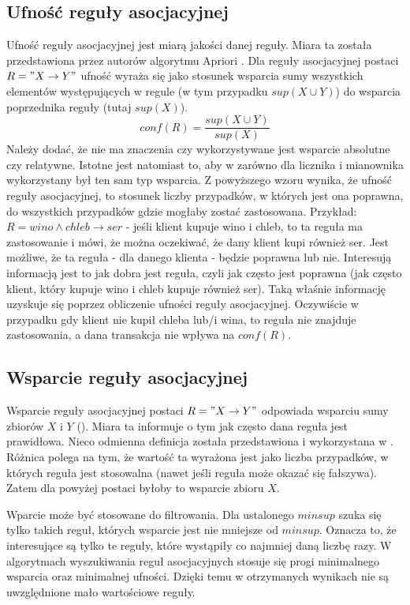 \subsection{Ufność reguły asocjacyjnej}
\label{c224}
Ufność reguły asocjacyjnej jest miarą jakości danej reguły. Miara ta została przedstawiona przez autorów algorytmu Apriori \cite{Agrawal}. Dla reguły asocjacyjnej postaci \(R = "X\rightarrow Y"\) ufność wyraża się jako stosunek wsparcia sumy wszystkich elementów występujących w regule (w tym przypadku \(sup(X \cup Y)\)) do wsparcia poprzednika reguły (tutaj \(sup(X)\)). 
\[conf(R) = \frac{sup(X \cup Y)}{sup(X)}\]
Należy dodać, że nie ma znaczenia czy wykorzystywane jest wsparcie absolutne czy relatywne. Istotne jest natomiast to, aby w zarówno dla licznika i mianownika wykorzystany był ten sam typ wsparcia.
Z powyższego wzoru wynika, że ufność reguły asocjacyjnej, to stosunek liczby przypadków, w których jest ona poprawna, do wszystkich przypadków gdzie mogłaby zostać zastosowana.
Przykład: \(R = wino \wedge chleb \rightarrow ser\) - jeśli klient kupuje wino i chleb, to ta reguła ma zastosowanie i mówi, że można oczekiwać, że dany klient kupi również ser. Jest możliwe, że ta reguła - dla danego klienta - będzie poprawna lub nie. Interesują informacją jest to jak dobra jest reguła, czyli jak często jest poprawna (jak często klient, który kupuje wino i chleb kupuje również ser). Taką właśnie informację uzyskuje się poprzez obliczenie ufności reguły asocjacyjnej. Oczywiście w przypadku gdy klient nie kupił chleba lub/i wina, to reguła nie znajduje zastosowania, a dana transakcja nie wpływa na \(conf(R)\). 

\subsection{Wsparcie reguły asocjacyjnej}
\label{c225}
Wsparcie reguły asocjacyjnej postaci \(R = "X\rightarrow Y"\) odpowiada wsparciu sumy zbiorów \(X\) i \(Y\) (\cite{Agrawal}). Miara ta informuje o tym jak często dana reguła jest prawidłowa. Nieco odmienna definicja została przedstawiona i wykorzystana w \cite{Borgelt}. Różnica polega na tym, że wartość ta wyrażona jest jako liczba przypadków, w których reguła jest stosowalna (nawet jeśli reguła może okazać się fałszywa). Zatem dla powyżej postaci byłoby to wsparcie zbioru \(X\). 

Wparcie może być stosowane do filtrowania. Dla ustalonego \(minsup\) szuka się tylko takich reguł, których wsparcie jest nie mniejsze od \(minsup\). Oznacza to, że interesujące są tylko te reguły, które wystąpiły co najmniej daną liczbę razy.
W algorytmach wyszukiwania reguł asocjacyjnych stosuje się progi minimalnego wsparcia oraz minimalnej ufności. Dzięki temu w otrzymanych wynikach nie są uwzględnione mało wartościowe reguły.

